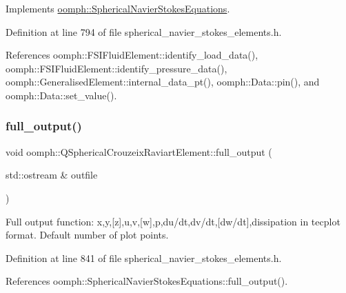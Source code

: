 Implements \hyperlink{classoomph_1_1SphericalNavierStokesEquations_ae4dc4c80f271ed2b31296f01862dc536}{oomph\+::\+Spherical\+Navier\+Stokes\+Equations}.



Definition at line 794 of file spherical\+\_\+navier\+\_\+stokes\+\_\+elements.\+h.



References oomph\+::\+F\+S\+I\+Fluid\+Element\+::identify\+\_\+load\+\_\+data(), oomph\+::\+F\+S\+I\+Fluid\+Element\+::identify\+\_\+pressure\+\_\+data(), oomph\+::\+Generalised\+Element\+::internal\+\_\+data\+\_\+pt(), oomph\+::\+Data\+::pin(), and oomph\+::\+Data\+::set\+\_\+value().

\mbox{\label{classoomph_1_1QSphericalCrouzeixRaviartElement_a777870285a6b1534bdeb8075fcad2299}} 
\subsubsection{\texorpdfstring{full\+\_\+output()}{full\_output()}\hspace{0.1cm}{\footnotesize\ttfamily [1/2]}}
{\footnotesize\ttfamily void oomph\+::\+Q\+Spherical\+Crouzeix\+Raviart\+Element\+::full\+\_\+output (\begin{DoxyParamCaption}\item[{std\+::ostream \&}]{outfile }\end{DoxyParamCaption})\hspace{0.3cm}{\ttfamily [inline]}}



Full output function\+: x,y,\mbox{[}z\mbox{]},u,v,\mbox{[}w\mbox{]},p,du/dt,dv/dt,\mbox{[}dw/dt\mbox{]},dissipation in tecplot format. Default number of plot points. 



Definition at line 841 of file spherical\+\_\+navier\+\_\+stokes\+\_\+elements.\+h.



References oomph\+::\+Spherical\+Navier\+Stokes\+Equations\+::full\+\_\+output().

\mbox{\label{classoomph_1_1QSphericalCrouzeixRaviartElement_a1e6532c250abfc46f2c24d2ccfdcfaaa}} 
